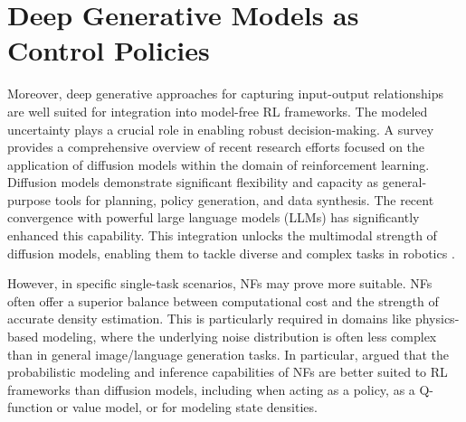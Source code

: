 \section{Deep Generative Models as Control Policies}
Moreover, deep generative approaches for capturing input-output relationships are well suited for integration into model-free \ac{RL} frameworks. The modeled uncertainty plays a crucial role in enabling robust decision-making. A survey \citep{zhu2024diffusion} provides a comprehensive overview of recent research efforts focused on the application of diffusion models within the domain of reinforcement learning. Diffusion models demonstrate significant flexibility and capacity as general-purpose tools for planning, policy generation, and data synthesis. The recent convergence with powerful large language models (LLMs) has significantly enhanced this capability. This integration unlocks the multimodal strength of diffusion models, enabling them to tackle diverse and complex tasks in robotics \citep{wen2025diffusionvla}. 

However, in specific single-task scenarios, \acp{NF} may prove more suitable. \acp{NF} often offer a superior balance between computational cost and the strength of accurate density estimation. This is particularly required in domains like physics-based modeling, where the underlying noise distribution is often less complex than in general image/language generation tasks. In particular, \citeauthor{ghugare2025nf} \citeyearpar{ghugare2025nf} argued that the probabilistic modeling and inference capabilities of \acp{NF} are better suited to \ac{RL} frameworks than diffusion models, including when acting as a policy, as a Q-function or value model, or for modeling state densities. 

